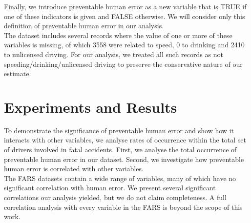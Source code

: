 \documentclass{article}
\theoremstyle{plain}
\theoremstyle{definition}
\theoremstyle{remark}
\begin{document}
Finally, we introduce preventable human error as a new variable that is TRUE if one of these indicators is given and FALSE otherwise. We will consider only this definition of preventable human error in our analysis.
\\
The dataset includes several records where the value of one or more of these variables is missing, of which 3558 were related to speed, 0 to drinking and 2410 to unlicensed driving. For our analysis, we treated all such records as not speeding/drinking/unlicensed driving to preserve the conservative nature of our estimate.
\section{Experiments and Results}\label{sec:results}
To demonstrate the significance of preventable human error and show how it interacts with other variables, we analyse rates of occurrence within the total set of drivers involved in fatal accidents. First, we analyse the total occurrence of preventable human error in our dataset. Second, we investigate how preventable human error is correlated with other variables.
\\
The FARS datasets contain a wide range of variables, many of which have no significant correlation with human error. We present several significant correlations our analysis yielded, but we do not claim completeness. A full correlation analysis with every variable in the FARS is beyond the scope of this work.
\end{document}
